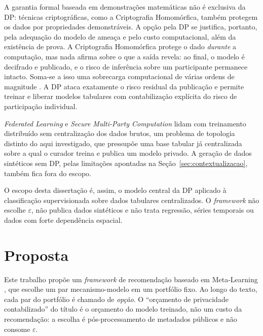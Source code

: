 A garantia formal baseada em demonstrações matemáticas não é exclusiva da DP: técnicas criptográficas, como a Criptografia Homomórfica, também protegem os dados por propriedades demonstráveis. A opção pela DP se justifica, portanto, pela adequação do modelo de ameaça e pelo custo computacional, além da existência de prova. A Criptografia Homomórfica protege o dado \emph{durante} a computação, mas nada afirma sobre o que a saída revela: ao final, o modelo é decifrado e publicado, e o risco de inferência sobre um participante permanece intacto. Soma-se a isso uma sobrecarga computacional de várias ordens de magnitude \cite{ref13}. A DP ataca exatamente o risco residual da publicação e permite treinar e liberar modelos tabulares com contabilização explícita do risco de participação individual.

\textit{Federated Learning} e \textit{Secure Multi-Party Computation} lidam com treinamento distribuído sem centralização dos dados brutos, um problema de topologia distinto do aqui investigado, que pressupõe uma base tabular já centralizada sobre a qual o curador treina e publica um modelo privado. A geração de dados sintéticos sem DP, pelas limitações apontadas na Seção~\ref{sec:contextualizacao}, também fica fora do escopo.

O escopo desta dissertação é, assim, o modelo central da DP aplicado à classificação supervisionada sobre dados tabulares centralizados. O \textit{framework} não escolhe $\varepsilon$, não publica dados sintéticos e não trata regressão, séries temporais ou dados com forte dependência espacial.

\section{Proposta}
\label{sec:proposta}

Este trabalho propõe um \textit{framework} de recomendação baseado em Meta-Learning \cite{ref33}, que escolhe um par mecanismo-modelo em um portfólio fixo. Ao longo do texto, cada par do portfólio é chamado de \emph{opção}. O ``orçamento de privacidade contabilizado'' do título é o orçamento do modelo treinado, não um custo da recomendação: a escolha é pós-processamento de metadados públicos e não consome $\varepsilon$.

